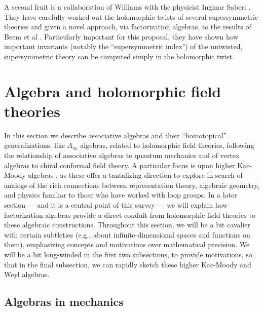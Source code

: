 \documentclass[11pt]{amsart}
\begin{document}
A second fruit is a collaboration of Williams with the physicist Ingmar Saberi \cite{SabWil1,SabWil2}.
They have carefully worked out the holomorphic twists of several supersymmetric theories
and given a novel approach, via factorization algebras, to the results of Beem et al \cite{Beem}.
Particularly important for this proposal,
they have shown how important invariants (notably the ``supersymmetric index") of the untwisted, supersymmetric theory can be computed simply in the holomorphic twist.



\section{Algebra and holomorphic field theories}

In this section we describe  associative algebras and their ``homotopical'' generalizations, like $A_\infty$ algebras, related to holomorphic field theories,
following the relationship of associative algebras to quantum mechanics and of vertex algebras to chiral conformal field theory.
A particular focus is upon higher Kac-Moody algebras \cite{FHK},
as these offer a tantalizing direction to explore in search of analogs of the rich connections between representation theory, algebraic geometry, and physics familiar to those who have worked with loop groups.
In a later section --- and it is a central point of this survey --- we will explain how factorization algebras provide a direct conduit from holomorphic field theories to these algebraic constructions.
Throughout this section, we will be a bit cavalier with certain subtleties (e.g., about infinite-dimensional spaces and functions on them), 
emphasizing concepts and motivations over mathematical precision.
We will be a bit long-winded in the first two subsections, to provide motivations,
so that in the final subsection, we can rapidly sketch these higher Kac-Moody and Weyl algebras.

\subsection{Algebras in mechanics}
\end{document}
